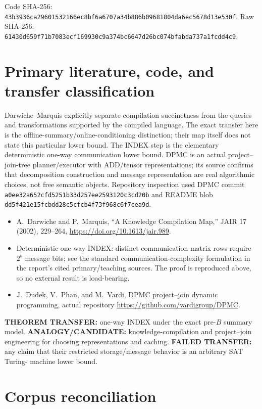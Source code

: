 \documentclass[11pt]{article}
\begin{document}
Code SHA-256:
\texttt{43b3936ca29601532166ec8bf6a6707a34b886b09681804da6ec5678d13e530f}.
Raw SHA-256:
\texttt{61430d659f71b7083ecf169930c9a374bc6647d26bc074bfabda737a1fcdd4c9}.

\section{Primary literature, code, and transfer classification}
Darwiche--Marquis explicitly separate compilation succinctness from the queries
and transformations supported by the compiled language.  The exact transfer
here is the offline-summary/online-conditioning distinction; their map itself
does not state this particular lower bound.  The INDEX step is the elementary
deterministic one-way communication lower bound.  DPMC is an actual
project--join-tree planner/executor with ADD/tensor representations; its source
confirms that decomposition construction and message representation are real
algorithmic choices, not free semantic objects.  Repository inspection used
DPMC commit \texttt{a0ee32a652cfd5251b33d257ee2593120c3cd20b} and README blob
\texttt{dd5f421e15fcbdd28c5cfcb4f73f968c6f7cea9d}.

\begin{itemize}
\item A.~Darwiche and P.~Marquis, ``A Knowledge Compilation Map,'' JAIR 17
(2002), 229--264, \url{https://doi.org/10.1613/jair.989}.
\item Deterministic one-way INDEX: distinct communication-matrix rows require
$2^b$ message bits; see the standard communication-complexity formulation in
the report's cited primary/teaching sources.  The proof is reproduced above,
so no external result is load-bearing.
\item J.~Dudek, V.~Phan, and M.~Vardi, DPMC project--join dynamic programming,
actual repository \url{https://github.com/vardigroup/DPMC}.
\end{itemize}

\textbf{THEOREM TRANSFER:} one-way INDEX under the exact pre-$B$ summary model.
\textbf{ANALOGY/CANDIDATE:} knowledge-compilation and project--join engineering
for choosing representations and caching.  \textbf{FAILED TRANSFER:} any claim
that their restricted storage/message behavior is an arbitrary SAT Turing-
machine lower bound.

\section{Corpus reconciliation}
\end{document}
